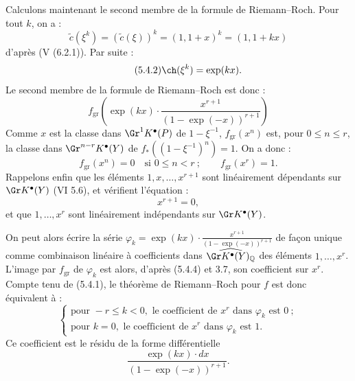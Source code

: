 
Calculons maintenant le second membre de la formule de Riemann--Roch. Pour tout \(k\), on a :
\[
 \widetilde c(\xi^k)=(\widetilde c(\xi))^k=(1,1+x)^k=(1,1+kx)
\]
d'après (V (6.2.1)). Par suite :
\begin{equation}\tag{5.4.2}
 \ch(\xi^k)=\exp(kx).
\end{equation}
Le second membre de la formule de Riemann--Roch est donc :
\begin{equation}\tag{5.4.3}
 f_{\mathrm{gr}}\left(\exp(kx)\cdot
 \frac{x^{r+1}}{(1-\exp(-x))^{r+1}}\right)
\end{equation}
Comme \(x\) est la classe dans \(\Gr^1K^{\bullet}(P)\) de \(1-\xi^{-1}\), \(f_{\mathrm{gr}}(x^n)\) est, pour \(0\leq n\leq r\), la classe dans
\(\Gr^{n-r}K^{\bullet}(Y)\) de \(f_*((1-\xi^{-1})^n)=1\). On a donc :
\begin{equation}\tag{5.4.4}
 f_{\mathrm{gr}}(x^n)=0\quad\text{si }0\leq n<r~;\qquad
 f_{\mathrm{gr}}(x^r)=1.
\end{equation}
Rappelons enfin que les éléments \(1,x,\ldots,x^{r+1}\) sont linéairement dépendants sur \(\Gr K^{\bullet}(Y)\) (VI 5.6), et vérifient l'équation :
\begin{equation}\tag{5.4.5}
 x^{r+1}=0,
\end{equation}
et que \(1,\ldots,x^r\) sont linéairement indépendants sur \(\Gr K^{\bullet}(Y)\).

On peut alors écrire la série \(\varphi_k=\exp(kx)\cdot\frac{x^{r+1}}{(1-\exp(-x))^{r+1}}\) de façon unique comme combinaison linéaire à coefficients dans
\(\widehat{\Gr K^{\bullet}(Y)_{\mathbb Q}}\) des éléments \(1,\ldots,x^r\). L'image par \(f_{\mathrm{gr}}\) de \(\varphi_k\) est alors, d'après (5.4.4) et 3.7, son coefficient sur \(x^r\). Compte tenu de (5.4.1), le théorème de Riemann--Roch pour \(f\) est donc équivalent à :
\[
\left\{
\begin{array}{ll}
\text{pour }-r\leq k<0,\text{ le coefficient de }x^r\text{ dans }\varphi_k\text{ est }0~;\\
\text{pour }k=0,\text{ le coefficient de }x^r\text{ dans }\varphi_k\text{ est }1.
\end{array}
\right.
\tag{RR}
\]
Ce coefficient est le résidu de la forme différentielle
\[
 \frac{\exp(kx)\cdot dx}{(1-\exp(-x))^{r+1}}.
\]
